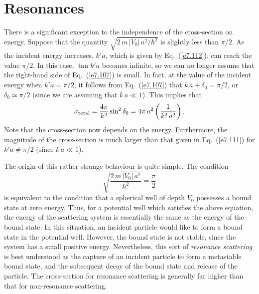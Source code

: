 \section{Resonances}
There is a significant exception to the independence of the cross-section on energy. Suppose that the quantity $\sqrt{2\,m \,|V_0|\,a^2/\hbar^2}$
is slightly less than $\pi/2$. As the incident energy increases, $k'a$,
which is given by Eq.~(\ref{e7.112}), can reach the value $\pi/2$. In this case,
$\tan k'a$ becomes infinite, so we can no longer assume that the right-hand side of Eq.~(\ref{e7.107}) is small. In fact,
at the value of the incident energy
when $k'a = \pi/2$, it follows from Eq.~(\ref{e7.107}) that $k\,a+\delta_0 = \pi/2$,
or $\delta_0 \simeq \pi/2$ (since we are assuming that $k\,a\ll 1$). 
This implies that
\begin{equation}
\sigma_{\rm total} = \frac{4\pi}{k^2} \sin^2\delta_0 = 4\pi \,a^2
\left(\frac{1}{k^2 \,a^2}\right).
\end{equation}
Note that the cross-section now depends on the energy. Furthermore, the
magnitude of the cross-section is much larger than that given in Eq.~(\ref{e7.111})
for $k'a\neq \pi/2$ (since $k\,a\ll 1$). 

The origin of this rather strange behaviour is quite simple. The condition
\begin{equation}
\sqrt{\frac{2\,m\,|V_0 |\,a^2}{\hbar^2} } = \frac{\pi}{2}
\end{equation}
is equivalent to the condition that a spherical well of depth
$V_0$ possesses a bound state at zero energy. Thus, for a potential
well which satisfies the above equation, the energy of the scattering system
is essentially the same as the energy of the bound state. In this situation,
an incident particle would like to form a bound state in the potential
well. However, the bound state is not stable, since the system has a small
positive energy. Nevertheless, this sort of {\em resonance scattering}
is best understood as the capture of an incident particle to form
a metastable bound state, and the subsequent decay of the bound state
and release of the particle. The cross-section for resonance scattering
is generally far higher than that for non-resonance scattering.

